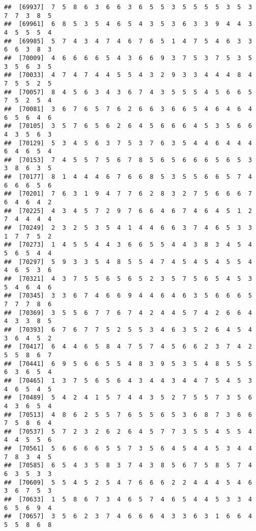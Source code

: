 \documentclass[
]{book}
\begin{document}
\begin{verbatim}
##  [69937]  7  5  8  6  3  6  6  3  6  5  5  3  5  5  5  5  3  5  3  7  7  3  8  5
##  [69961]  6  8  5  3  5  4  6  5  4  3  5  3  6  3  3  9  4  4  3  4  5  5  5  4
##  [69985]  5  7  4  3  4  7  4  6  7  6  5  1  4  7  5  4  6  3  3  6  6  3  8  3
##  [70009]  4  6  6  6  6  5  4  3  6  6  9  3  7  5  3  7  5  3  5  3  5  6  3  5
##  [70033]  4  7  4  7  4  4  5  5  4  3  2  9  3  3  4  4  4  8  4  7  5  5  2  5
##  [70057]  8  4  5  6  3  4  3  6  7  4  3  5  5  5  4  5  6  6  5  7  5  2  5  4
##  [70081]  3  6  7  6  5  7  6  2  6  6  3  6  6  5  4  6  4  6  4  6  5  6  4  6
##  [70105]  3  5  7  6  5  6  2  6  4  5  6  6  6  4  5  3  5  6  6  4  3  5  6  3
##  [70129]  5  3  4  5  6  3  7  5  3  7  6  3  5  4  4  6  4  4  4  6  4  6  5  4
##  [70153]  7  4  5  5  7  5  6  7  8  5  6  5  6  6  6  5  6  5  3  3  8  6  3  5
##  [70177]  8  1  4  4  4  6  7  6  6  8  5  3  5  5  6  6  5  7  4  6  6  6  5  6
##  [70201]  7  6  3  1  9  4  7  7  6  2  8  3  2  7  5  6  6  6  7  6  4  6  4  2
##  [70225]  4  3  4  5  7  2  9  7  6  6  4  6  7  4  6  4  5  1  2  7  4  4  4  4
##  [70249]  2  3  2  5  3  5  4  1  4  4  6  6  3  7  4  6  5  3  3  1  7  7  5  2
##  [70273]  1  4  5  5  4  4  3  6  6  5  5  4  4  3  8  3  4  5  4  5  6  5  4  4
##  [70297]  5  9  3  3  5  4  8  5  5  4  7  4  5  4  5  4  5  5  4  4  6  5  3  6
##  [70321]  4  3  7  5  5  6  5  6  5  2  3  5  7  5  6  5  4  5  3  5  4  6  4  6
##  [70345]  3  3  6  7  4  6  6  9  4  4  6  4  6  3  5  6  6  6  5  7  7  7  8  6
##  [70369]  3  5  5  6  7  7  6  7  4  2  4  4  5  7  4  2  6  6  4  4  3  3  8  5
##  [70393]  6  7  6  7  7  5  2  5  5  3  4  6  3  5  2  6  4  5  4  3  6  4  5  2
##  [70417]  6  4  4  6  5  8  4  7  5  7  4  5  6  6  2  3  7  4  2  5  5  8  6  7
##  [70441]  6  9  5  6  6  5  5  4  8  3  9  5  3  5  4  8  5  5  5  6  3  6  5  4
##  [70465]  1  3  7  5  6  5  6  4  3  4  4  3  4  4  7  5  4  5  3  4  6  5  4  5
##  [70489]  5  4  2  4  1  5  7  4  4  3  5  2  7  5  5  7  3  5  6  4  3  6  5  4
##  [70513]  4  8  6  2  5  5  7  6  5  5  6  5  3  6  8  7  3  6  6  7  5  8  6  4
##  [70537]  5  7  2  3  2  6  2  6  4  5  7  7  3  5  5  4  5  5  4  4  4  5  5  6
##  [70561]  5  6  6  6  6  5  5  7  3  5  6  4  5  4  4  5  3  4  4  7  8  3  4  5
##  [70585]  6  5  4  3  5  8  3  7  4  3  8  5  6  7  5  8  5  7  4  6  3  5  3  3
##  [70609]  5  5  4  5  2  5  4  7  6  6  6  2  2  4  4  4  5  4  6  3  6  7  5  3
##  [70633]  1  5  8  6  7  3  4  6  5  7  4  6  5  4  4  5  3  3  4  6  5  6  9  4
##  [70657]  3  5  6  2  3  7  4  6  6  6  4  3  3  6  3  1  6  6  4  5  5  8  6  8

\end{verbatim}
\end{document}
